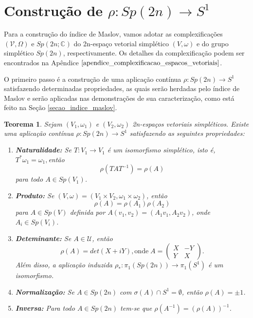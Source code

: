 \documentclass[12pt]{book}
\newtheorem{teorema}{Teorema}[section]
\newcommand{\circulo}{S^{1}}
\newcommand{\complexificado}[1]{\mathcal{#1}}
\newcommand{\complexo}[1]{\mathbb{C}^{#1}}
\newcommand{\grupofundamental}[1]{\pi_{1}(#1)}
\newcommand{\gruposimpletico}[1]{Sp(#1)}
\newcommand{\gruposimpleticocomplexo}[1]{Sp(#1; \complexo{})}
\newcommand{\matrizSimpleticaOrtogonal}{\mathcal{U}}
\begin{document}
	\section{Construção de $\rho: \gruposimpletico{2n} \to \circulo$}
	Para a construção do índice de Maslov, vamos adotar as complexificações $(\complexificado{V}, \Omega) $ e $\gruposimpleticocomplexo{2n}$ do 2n-espaço vetorial simplético $(V, \omega)$ e do grupo simplético $\gruposimpletico{2n}$, respectivamente. Os detalhes da complexificação podem ser encontrados na Apêndice $\ref{apendice_complexificacao_espacos_vetoriais}$. 
	
	O primeiro passo é a construção de uma aplicação contínua $\rho: \gruposimpletico{2n}\to \circulo$ satisfazendo determinadas propriedades, as quais serão herdadas pelo índice de Maslov e serão aplicadas nas demonstrações de sua caracterização, como está feito na Seção \ref{secao_indice_maslov}.
	
	\begin{teorema}\label{teorema_aplicacao_rho}
		Sejam $(V_{1}, \omega_{1})$ e $(V_{2}, \omega_{2})$ 2n-espaços vetoriais simpléticos. Existe uma aplicação contínua $\rho:Sp(2n) \to S^{1}$ satisfazendo as seguintes propriedades:
		\begin{enumerate}
			\item \label{item_naturalidade_rho} \textbf{Naturalidade:}  Se $T:V_{1} \to V_{1}$ é um isomorfismo simplético, isto é, $T^{*}\omega_{1} = \omega_{1}, $então 
			$$
			\rho(TAT^{-1}) = \rho(A)
			$$
			para todo $A\in \gruposimpletico{V_{1}}$.
			
			\item \label{item_produto_rho} \textbf{Produto:} Se $(V,\omega) = (V_{1}\times V_{2},\omega_{1}\times \omega_{2})$, então
			$$
			\rho(A) = \rho(A_{1})\rho(A_{2})
			$$
			para $A\in \gruposimpletico{V}$ definida por $A(v_{1}, v_{2})=(A_{1}v_{1}, A_{2}v_{2})$, onde $A_{i} \in \gruposimpletico{V_{i}}$.
			
			\item \label{item_determinante_rho} \textbf{Deteminante:} Se $A\in \matrizSimpleticaOrtogonal$, então 
			$$
			\rho(A) = det(X+iY), \text{onde} \;	
			A=\left(
			\begin{array}{cc}
			X & -Y					\\
			Y & X
			\end{array}
			\right).
			$$
			Além disso, a aplicação induzida $\rho_{*}: \grupofundamental{\gruposimpletico{2n}} \to \grupofundamental{\circulo}$ é um isomorfismo.
			
			\item \label{item_normalizacao_rho} \textbf{Normalização:} Se $A \in \gruposimpletico{2n}$ com $\sigma(A)\cap \circulo = \emptyset$, então $\rho(A) = \pm 1$.
			
			\item \label{item_inversa_rho} \textbf{Inversa:} Para todo $A \in \gruposimpletico{2n}$ tem-se que $\rho(A^{-1})=(\rho(A))^{-1}$. 
		\end{enumerate}
	\end{teorema}
	
\end{document}
